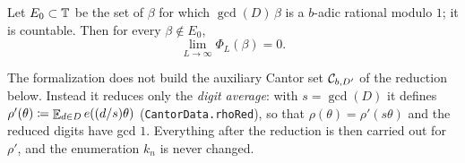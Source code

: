 \begin{lemma}
  \label{lem:irrational}
  \leanok
  Let $E_0 \subset \mathbb{T}$ be the set of $\beta$ for which $\gcd(D)\,\beta$ is a $b$-adic rational
  modulo $1$; it is countable.  Then for every $\beta \notin E_0$,
  \[ \lim_{L \to \infty} \Phi_L(\beta) = 0 . \]
\end{lemma}

\begin{remark}
  The formalization does not build the auxiliary Cantor set $\mathcal{C}_{b,D'}$ of the reduction
  below.  Instead it reduces only the \emph{digit average}: with $s = \gcd(D)$ it defines
  $\rho'(\theta) \coloneqq \mathop{\mathbb{E}}_{d \in D} e((d/s)\theta)$
  (\texttt{CantorData.rhoRed}), so that $\rho(\theta) = \rho'(s\theta)$ and the reduced
  digits have gcd $1$.  Everything after the reduction is then carried out for $\rho'$, and
  the enumeration $k_n$ is never changed.
\end{remark}

